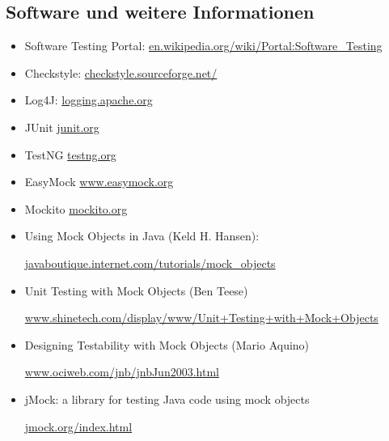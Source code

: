 \subsection{Software und weitere Informationen}
\begin{itemize}
\item Software Testing Portal:
\href{http://en.wikipedia.org/wiki/Portal:Software_Testing}
{en.wikipedia.org/wiki/Portal:Software\_Testing}
\item Checkstyle: \href{http://checkstyle.sourceforge.net/}
                         {checkstyle.sourceforge.net/}
\item Log4J: \href{http://logging.apache.org}{logging.apache.org}
\item JUnit \href{http://junit.org}{junit.org}
\item TestNG \href{http://testng.org}{testng.org}
\item EasyMock \href{http://www.easymock.org}{www.easymock.org}
\item Mockito \href{http://mockito.org}{mockito.org}
\item Using Mock Objects in Java (Keld H. Hansen):

  \href{http://javaboutique.internet.com/tutorials/mock_objects}
  {javaboutique.internet.com/tutorials/mock\_objects}
\item Unit Testing with Mock Objects (Ben Teese)

\href{http://www.shinetech.com/display/www/Unit+Testing+with+Mock+Objects}
   {www.shinetech.com/display/www/Unit+Testing+with+Mock+Objects}

\item Designing Testability with Mock Objects (Mario Aquino)

\href{http://www.ociweb.com/jnb/jnbJun2003.html}
  {www.ociweb.com/jnb/jnbJun2003.html}

\item jMock: a library for testing Java code using mock objects

\href{http://jmock.org/index.html}{jmock.org/index.html}


\end{itemize}
